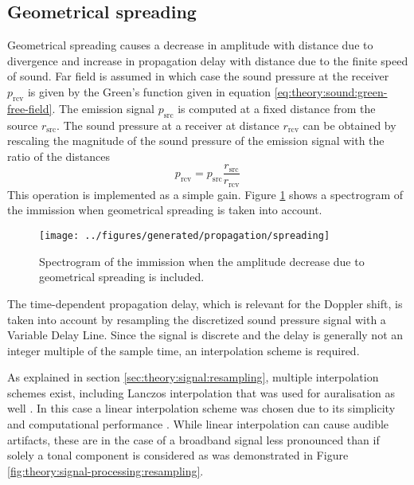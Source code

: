 \newpage
\subsection{Geometrical spreading}
Geometrical spreading causes a decrease in amplitude with distance due to
divergence and increase in propagation delay with distance due to the finite
speed of sound. Far field is assumed in which case the sound pressure at the
receiver $p_{\mathrm{rcv}}$ is given by the Green's function given in equation
\eqref{eq:theory:sound:green-free-field}. The emission signal $p_{\mathrm{src}}$
is computed at a fixed distance from the source $r_{\mathrm{src}}$. The sound
pressure at a receiver at distance $r_{\mathrm{rcv}}$ can be obtained by
rescaling the magnitude of the sound pressure of the emission signal with the
ratio of the distances
\begin{equation}
 p_{\mathrm{rcv}} = p_{\mathrm{src}} \frac{r_{\mathrm{src}}}{r_{\mathrm{rcv}}}
\end{equation}
This operation is implemented as a simple gain. Figure
\ref{fig:implementation:propagation:spreading} shows a spectrogram of the
immission when geometrical spreading is taken into account.

\begin{figure}[H]
  \centering
  \texttt{[image: ../figures/generated/propagation/spreading]}
  \caption{Spectrogram of the immission when the amplitude decrease due to geometrical spreading is included.}
  \label{fig:implementation:propagation:spreading}
\end{figure}

The time-dependent propagation delay, which is relevant for the Doppler shift,
is taken into account by resampling the discretized sound pressure signal with a
Variable Delay Line. Since the signal is discrete and the delay is generally not
an integer multiple of the sample time, an interpolation scheme is required.

As explained in section \ref{sec:theory:signal:resampling}, multiple
interpolation schemes exist, including Lanczos interpolation that was used for
auralisation as well \cite{Rietdijk2015, Pieren2015}. In this case a linear
interpolation scheme was chosen due to its simplicity and computational
performance \cite{Heutschi2014}. While linear interpolation can cause audible
artifacts, these are in the case of a broadband signal less pronounced than if
solely a tonal component is considered as was demonstrated in Figure
\ref{fig:theory:signal-processing:resampling}.

